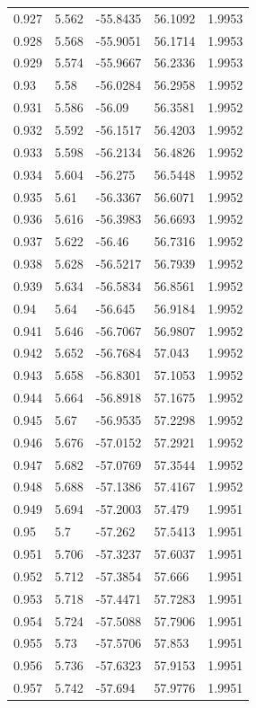 \begin{tabular}{lllll}
0.927 & 5.562 & -55.8435 & 56.1092 & 1.9953 \\
0.928 & 5.568 & -55.9051 & 56.1714 & 1.9953 \\
0.929 & 5.574 & -55.9667 & 56.2336 & 1.9953 \\
0.93 & 5.58 & -56.0284 & 56.2958 & 1.9952 \\
0.931 & 5.586 & -56.09 & 56.3581 & 1.9952 \\
0.932 & 5.592 & -56.1517 & 56.4203 & 1.9952 \\
0.933 & 5.598 & -56.2134 & 56.4826 & 1.9952 \\
0.934 & 5.604 & -56.275 & 56.5448 & 1.9952 \\
0.935 & 5.61 & -56.3367 & 56.6071 & 1.9952 \\
0.936 & 5.616 & -56.3983 & 56.6693 & 1.9952 \\
0.937 & 5.622 & -56.46 & 56.7316 & 1.9952 \\
0.938 & 5.628 & -56.5217 & 56.7939 & 1.9952 \\
0.939 & 5.634 & -56.5834 & 56.8561 & 1.9952 \\
0.94 & 5.64 & -56.645 & 56.9184 & 1.9952 \\
0.941 & 5.646 & -56.7067 & 56.9807 & 1.9952 \\
0.942 & 5.652 & -56.7684 & 57.043 & 1.9952 \\
0.943 & 5.658 & -56.8301 & 57.1053 & 1.9952 \\
0.944 & 5.664 & -56.8918 & 57.1675 & 1.9952 \\
0.945 & 5.67 & -56.9535 & 57.2298 & 1.9952 \\
0.946 & 5.676 & -57.0152 & 57.2921 & 1.9952 \\
0.947 & 5.682 & -57.0769 & 57.3544 & 1.9952 \\
0.948 & 5.688 & -57.1386 & 57.4167 & 1.9952 \\
0.949 & 5.694 & -57.2003 & 57.479 & 1.9951 \\
0.95 & 5.7 & -57.262 & 57.5413 & 1.9951 \\
0.951 & 5.706 & -57.3237 & 57.6037 & 1.9951 \\
0.952 & 5.712 & -57.3854 & 57.666 & 1.9951 \\
0.953 & 5.718 & -57.4471 & 57.7283 & 1.9951 \\
0.954 & 5.724 & -57.5088 & 57.7906 & 1.9951 \\
0.955 & 5.73 & -57.5706 & 57.853 & 1.9951 \\
0.956 & 5.736 & -57.6323 & 57.9153 & 1.9951 \\
0.957 & 5.742 & -57.694 & 57.9776 & 1.9951 \\

\end{tabular}
